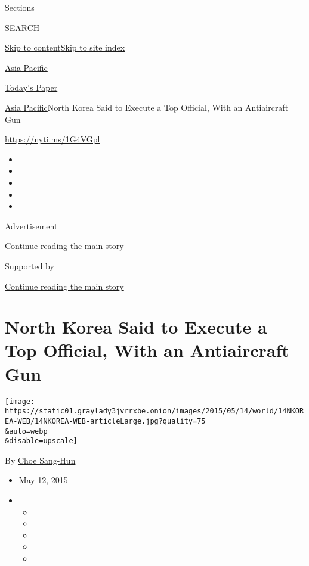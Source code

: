Sections

SEARCH

\protect\hyperlink{site-content}{Skip to
content}\protect\hyperlink{site-index}{Skip to site index}

\href{https://www.nytimes3xbfgragh.onion/section/world/asia}{Asia
Pacific}

\href{https://myaccount.nytimes3xbfgragh.onion/auth/login?response_type=cookie\&client_id=vi}{}

\href{https://www.nytimes3xbfgragh.onion/section/todayspaper}{Today's
Paper}

\href{/section/world/asia}{Asia Pacific}\textbar{}North Korea Said to
Execute a Top Official, With an Antiaircraft Gun

\url{https://nyti.ms/1G4VGpl}

\begin{itemize}
\item
\item
\item
\item
\item
\end{itemize}

Advertisement

\protect\hyperlink{after-top}{Continue reading the main story}

Supported by

\protect\hyperlink{after-sponsor}{Continue reading the main story}

\hypertarget{north-korea-said-to-execute-a-top-official-with-an-antiaircraft-gun}{%
\section{North Korea Said to Execute a Top Official, With an
Antiaircraft
Gun}\label{north-korea-said-to-execute-a-top-official-with-an-antiaircraft-gun}}

\texttt{[image: https://static01.graylady3jvrrxbe.onion/images/2015/05/14/world/14NKOREA-WEB/14NKOREA-WEB-articleLarge.jpg?quality=75\\\&auto=webp\\\&disable=upscale]}

By \href{http://www.nytimes3xbfgragh.onion/by/choe-sang-hun}{Choe
Sang-Hun}

\begin{itemize}
\item
  May 12, 2015
\item
  \begin{itemize}
  \item
  \item
  \item
  \item
  \item
  \end{itemize}
\end{itemize}


